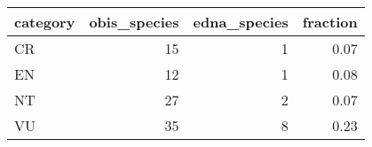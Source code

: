 \begin{longtable}{lrrr}
  \hline
category & obis\_species & edna\_species & fraction \\ 
  \hline
CR &  15 &   1 & 0.07 \\ 
  EN &  12 &   1 & 0.08 \\ 
  NT &  27 &   2 & 0.07 \\ 
  VU &  35 &   8 & 0.23 \\ 
   \hline
\hline
\end{longtable}
